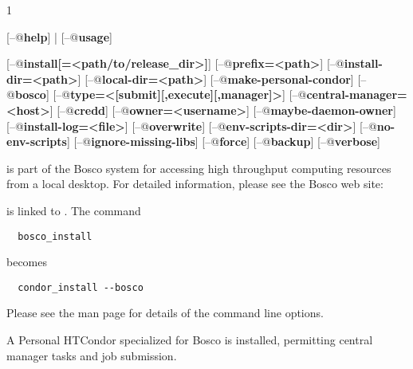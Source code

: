 \begin{ManPage}{\label{man-bosco-install}}{1}
{ }


\Synopsis {}
[\verb@--@\textbf{help}] | [\verb@--@\textbf{usage}]

[\verb@--@\textbf{install[=<path/to/release\_dir>]}]
[\verb@--@\textbf{prefix=<path>}]
[\verb@--@\textbf{install-dir=<path>}]
[\verb@--@\textbf{local-dir=<path>}]
[\verb@--@\textbf{make-personal-condor}]
[\verb@--@\textbf{bosco}]
[\verb@--@\textbf{type=<[submit][,execute][,manager]>}]
[\verb@--@\textbf{central-manager=<host>}]
[\verb@--@\textbf{credd}]
[\verb@--@\textbf{owner=<username>}]
[\verb@--@\textbf{maybe-daemon-owner}]
[\verb@--@\textbf{install-log=<file>}]
[\verb@--@\textbf{overwrite}]
[\verb@--@\textbf{env-scripts-dir=<dir>}]
[\verb@--@\textbf{no-env-scripts}]
[\verb@--@\textbf{ignore-missing-libs}]
[\verb@--@\textbf{force}]
[\verb@--@\textbf{backup}]
[\verb@--@\textbf{verbose}]

\Description

 is part of the Bosco system for accessing high
throughput computing resources from a local desktop.
For detailed information, please see the Bosco web site:

 is linked to .
The command
\begin{verbatim}
  bosco_install
\end{verbatim}
becomes
\begin{verbatim}
  condor_install --bosco
\end{verbatim}
Please see the  man page
for details of the command line options.

A Personal HTCondor specialized for Bosco is installed,
permitting central manager tasks and job submission. 


\end{ManPage}
